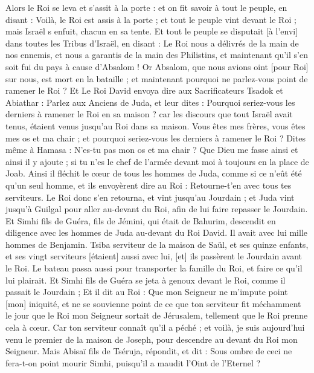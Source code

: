 \begin{multicols}{2}
Alors le Roi se leva et s'assit à la porte : et on fit savoir à tout le peuple, en disant : Voilà, le Roi est assis à la porte ; et tout le peuple vint devant le Roi ; mais Israël s enfuit, chacun en sa tente.
Et tout le peuple se disputait [à l'envi] dans toutes les Tribus d'Israël, en disant : Le Roi nous a délivrés de la main de nos ennemis, et nous a garantis de la main des Philistins, et maintenant qu'il s'en soit fui du pays à cause d'Absalom !
Or Absalom, que nous avions oint [pour Roi] sur nous, est mort en la bataille ; et maintenant pourquoi ne parlez-vous point de ramener le Roi ?
Et Le Roi David envoya dire aux Sacrificateurs Tsadok et Abiathar : Parlez aux Anciens de Juda, et leur dites : Pourquoi seriez-vous les derniers à ramener le Roi en sa maison ? car les discours que tout Israël avait tenus, étaient venus jusqu'au Roi dans sa maison.
Vous êtes mes frères, vous êtes mes os et ma chair ; et pourquoi seriez-vous les derniers à ramener le Roi ?
Dites même à Hamasa : N'es-tu pas mon os et ma chair ? Que Dieu me fasse ainsi et ainsi il y ajoute ; si tu n'es le chef de l'armée devant moi à toujours en la place de Joab.
Ainsi il fléchit le cœur de tous les hommes de Juda, comme si ce n'eût été qu'un seul homme, et ils envoyèrent dire au Roi : Retourne-t'en avec tous tes serviteurs.
Le Roi donc s'en retourna, et vint jusqu'au Jourdain ; et Juda vint jusqu'à Guilgal pour aller au-devant du Roi, afin de lui faire repasser le Jourdain.
Et Simhi fils de Guéra, fils de Jémini, qui était de Bahurim, descendit en diligence avec les hommes de Juda au-devant du Roi David.
Il avait avec lui mille hommes de Benjamin. Tsiba serviteur de la maison de Saül, et ses quinze enfants, et ses vingt serviteurs [étaient] aussi avec lui, [et] ils passèrent le Jourdain avant le Roi.
Le bateau passa aussi pour transporter la famille du Roi, et faire ce qu'il lui plairait. Et Simhi fils de Guéra se jeta à genoux devant le Roi, comme il passait le Jourdain ;
Et il dit au Roi : Que mon Seigneur ne m'impute point [mon] iniquité, et ne se souvienne point de ce que ton serviteur fit méchamment le jour que le Roi mon Seigneur sortait de Jérusalem, tellement que le Roi prenne cela à cœur.
Car ton serviteur connaît qu'il a péché ; et voilà, je suis aujourd'hui venu le premier de la maison de Joseph, pour descendre au devant du Roi mon Seigneur.
Mais Abisaï fils de Tséruja, répondit, et dit : Sous ombre de ceci ne fera-t-on point mourir Simhi, puisqu'il a maudit l'Oint de l'Eternel ?

\end{multicols}
